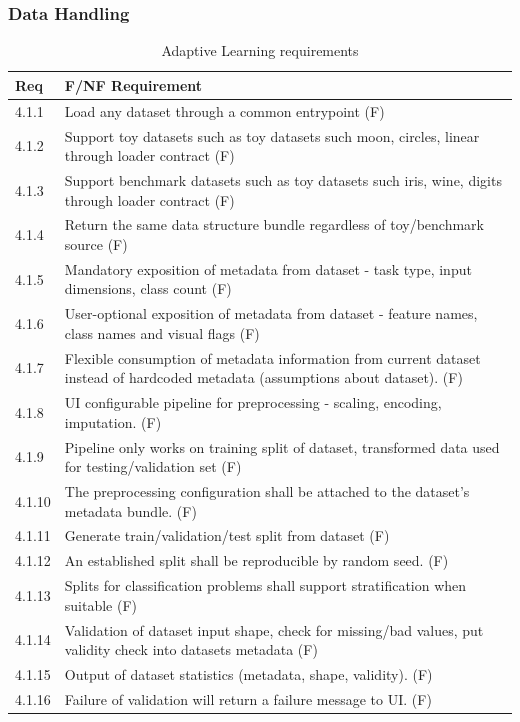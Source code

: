 \documentclass{article}
\begin{document}
\subsubsection{Data Handling}
\begin{table}[H]
\centering
\begin{tabular}{|p{1cm}|p{12.5cm}|}
\hline
\textbf{Req} & \textbf{F/NF Requirement} \\
\hline
4.1.1 & Load any dataset through a common entrypoint (F) \\
\hline
4.1.2 & Support toy datasets such as toy datasets such moon, circles, linear through loader contract (F) \\
\hline
4.1.3 & Support benchmark datasets such as toy datasets such iris, wine, digits through loader contract (F) \\
\hline
4.1.4 & Return the same data structure bundle regardless of toy/benchmark source (F) \\
\hline %
4.1.5 & Mandatory exposition of metadata from dataset - task type, input dimensions, class count (F) \\
\hline
4.1.6 & User-optional exposition of metadata from dataset - feature names, class names and visual flags (F) \\ %
\hline
4.1.7 & Flexible consumption of metadata information from current dataset instead of hardcoded metadata (assumptions about dataset). (F) \\ %
\hline
4.1.8 & UI configurable pipeline for preprocessing - scaling, encoding, imputation. (F) \\
\hline
4.1.9 & Pipeline only works on training split of dataset, transformed data used for testing/validation set (F) \\
\hline
4.1.10 & The preprocessing configuration shall be attached to the dataset's metadata bundle. (F) \\
\hline
4.1.11 & Generate train/validation/test split from dataset (F) \\
\hline
4.1.12 & An established split shall be reproducible by random seed. (F) \\
\hline
4.1.13 & Splits for classification problems shall support stratification when suitable (F) \\
\hline %
4.1.14 & Validation of dataset input shape, check for missing/bad values, put validity check into datasets metadata (F) \\
\hline
4.1.15 & Output of dataset statistics (metadata, shape, validity). (F) \\
\hline
4.1.16 & Failure of validation will return a failure message to UI. (F) \\
\hline
\end{tabular}
\caption{Adaptive Learning requirements}
\end{table}
\end{document}
